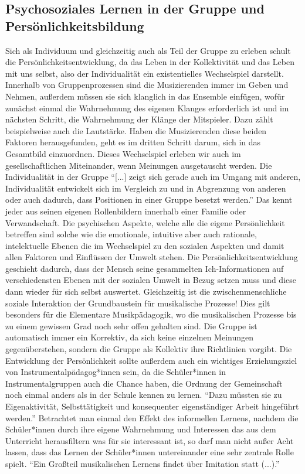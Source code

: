 \subsection{Psychosoziales Lernen in der Gruppe und Persönlichkeitsbildung}
Sich als Individuum und gleichzeitig auch als Teil der Gruppe zu erleben schult
die Persönlichkeitsentwicklung, da das Leben in der Kollektivität und
das Leben mit uns selbst, also der Individualität ein existentielles
Wechselspiel darstellt. Innerhalb von Gruppenprozessen sind die Musizierenden
immer im Geben und Nehmen, außerdem müssen sie sich klanglich in das Ensemble
einfügen, wofür zunächst einmal die Wahrnehmung des eigenen Klanges erforderlich
ist und im nächsten Schritt, die Wahrnehmung der Klänge der Mitspieler. Dazu
zählt beispielweise auch die Lautstärke. Haben die Musizierenden diese beiden
Faktoren herausgefunden, geht es im dritten Schritt darum, sich in das
Gesamtbild einzuordnen. Dieses Wechselspiel erleben wir auch im
gesellschaftlichen Miteinander, wenn Meinungen ausgetauscht werden. Die
Individualität in der Gruppe \enquote{[...] zeigt sich gerade auch im Umgang mit
anderen, Individualität entwickelt sich im Vergleich zu und in Abgrenzung von
anderen oder auch dadurch, dass Positionen in einer Gruppe besetzt
werden.}\autocite[95]{ribke:emp} Das kennt jeder aus seinen eigenen
Rollenbildern innerhalb einer Familie oder Verwandschaft. Die psychischen
Aspekte, welche alle die eigene Persönlichkeit betreffen sind solche wie die
emotionale, intuitive aber auch rationale, intelektuelle Ebenen die im
Wechselspiel zu den sozialen Aspekten und damit allen Faktoren und Einflüssen
der Umwelt stehen. Die Persönlichkeitsentwicklung geschieht dadurch, dass der
Mensch seine gesammelten Ich-Informationen auf verschiedensten Ebenen mit der
sozialen Umwelt in Bezug setzen muss und diese dann wieder für sich selbst
auswertet. Gleichzeitig ist die zwischenmenschliche soziale Interaktion der
Grundbaustein für musikalische Prozesse! Dies gilt besonders für die Elementare
Musikpädagogik, wo die musikalischen Prozesse bis zu einem gewissen Grad noch
sehr offen gehalten sind. Die Gruppe ist automatisch immer ein Korrektiv, da
sich keine einzelnen Meinungen gegenüberstehen, sondern die Gruppe als Kollektiv
ihre Richtlinien vorgibt. Die Entwicklung der Persönlichkeit sollte außerdem
auch ein wichtiges Erziehungsziel von Instrumentalpädagog*innen sein, da die
Schüler*innen in Instrumentalgruppen auch die Chance haben, die Ordnung der
Gemeinschaft noch einmal anders als in der Schule kennen zu lernen.
\enquote{Dazu müssten sie zu Eigenaktivität, Selbsttätigkeit und konsequenter
eigenständiger Arbeit hingeführt
werden.}\autocite[64]{losert:die_kunst_zu_unterrichten} Betrachtet man einmal
den Effekt des informellen Lernens, nachdem die Schüler*innen durch ihre
eigene Wahrnehmung und Interessen das aus dem Unterricht herausfiltern was für
sie interessant ist, so darf man nicht außer Acht lassen, dass das Lernen der
Schüler*innen untereinander eine sehr zentrale Rolle spielt. \enquote{Ein
Großteil musikalischen Lernens findet über Imitation statt
(...).}\autocite[98]{doerne:umfassend_musizieren}


